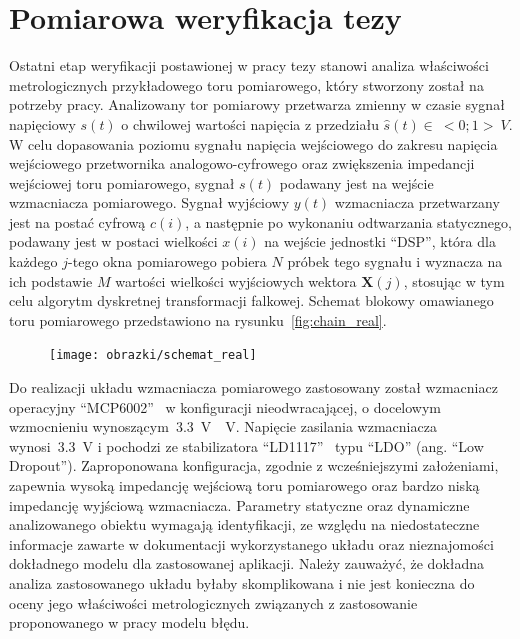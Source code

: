 \chapter{Pomiarowa weryfikacja tezy}

Ostatni etap weryfikacji postawionej w pracy tezy stanowi analiza właściwości metrologicznych przykładowego toru pomiarowego, który stworzony został na potrzeby pracy. Analizowany tor pomiarowy przetwarza zmienny w czasie sygnał napięciowy $s(t)$ o chwilowej wartości napięcia z przedziału $\hat{s}(t) \in~<0;1>~\unit{V}$. W celu dopasowania poziomu sygnału napięcia wejściowego do zakresu napięcia wejściowego przetwornika analogowo-cyfrowego oraz zwiększenia impedancji wejściowej toru pomiarowego, sygnał $s(t)$ podawany jest na wejście wzmacniacza pomiarowego. Sygnał wyjściowy $y(t)$ wzmacniacza przetwarzany jest na postać cyfrową $c(i)$, a następnie po wykonaniu odtwarzania statycznego, podawany jest w postaci wielkości $x(i)$ na wejście jednostki \enquote{DSP}, która dla każdego $j$-tego okna pomiarowego pobiera $N$ próbek tego sygnału i wyznacza na ich podstawie $M$ wartości wielkości wyjściowych wektora $\mathbf{X}(j)$, stosując w tym celu algorytm dyskretnej transformacji falkowej. Schemat blokowy omawianego toru pomiarowego przedstawiono na rysunku~\ref{fig:chain_real}.

\begin{figure}[htb!]
\begin{center}
\texttt{[image: obrazki/schemat\_real]}
\end{center}
\end{figure}

Do realizacji układu wzmacniacza pomiarowego zastosowany został wzmacniacz operacyjny \enquote{MCP6002}~\cite{microchip_manual} w konfiguracji nieodwracającej, o docelowym wzmocnieniu wynoszącym~\qty{3.3}{V \per V}. Napięcie zasilania wzmacniacza wynosi~\qty{3.3}{V} i pochodzi ze stabilizatora \enquote{LD1117}~\cite{stm_manual} typu \enquote{LDO} (ang. \enquote{Low Dropout}). Zaproponowana konfiguracja, zgodnie z wcześniejszymi założeniami, zapewnia wysoką impedancję wejściową toru pomiarowego oraz bardzo niską impedancję wyjściową wzmacniacza. Parametry statyczne oraz dynamiczne analizowanego obiektu wymagają identyfikacji, ze względu na niedostateczne informacje zawarte w dokumentacji wykorzystanego układu oraz nieznajomości dokładnego modelu dla zastosowanej aplikacji. Należy zauważyć, że dokładna analiza zastosowanego układu byłaby skomplikowana i nie jest konieczna do oceny jego właściwości metrologicznych związanych z zastosowanie proponowanego w pracy modelu błędu.


